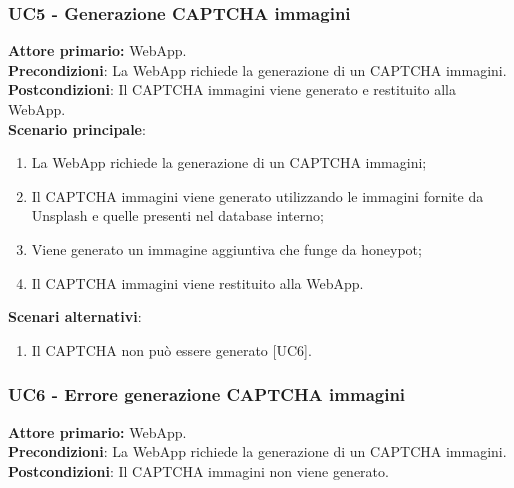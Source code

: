\subsubsection{UC5 - Generazione CAPTCHA immagini}
\textbf{Attore primario:} WebApp.\\
\textbf{Precondizioni}: La WebApp richiede la generazione di un CAPTCHA immagini.\\
\textbf{Postcondizioni}: Il CAPTCHA immagini viene generato e restituito alla WebApp.\\

\textbf{Scenario principale}:
\begin{enumerate}
    \item La WebApp richiede la generazione di un CAPTCHA immagini;
    \item Il CAPTCHA immagini viene generato utilizzando le immagini fornite da Unsplash e quelle presenti nel database interno;
    \item Viene generato un immagine aggiuntiva che funge da honeypot;
    \item Il CAPTCHA immagini viene restituito alla WebApp.
\end{enumerate}
\textbf{Scenari alternativi}:
\begin{enumerate}
    \item Il CAPTCHA non può essere generato [UC6].
\end{enumerate}

\subsubsection{UC6 - Errore generazione CAPTCHA immagini}
\textbf{Attore primario:} WebApp.\\
\textbf{Precondizioni}: La WebApp richiede la generazione di un CAPTCHA immagini.\\
\textbf{Postcondizioni}: Il CAPTCHA immagini non viene generato.\\

